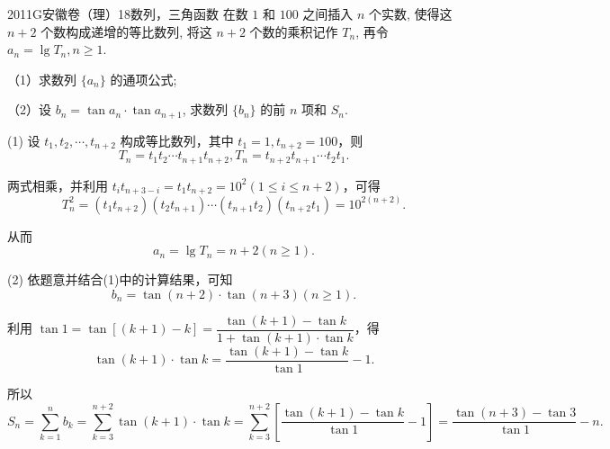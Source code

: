 
\begin{problem}{2011}{G}{安徽卷（理）}{18}{数列，三角函数}
在数 $1$ 和 $100$ 之间插入 $n$ 个实数, 使得这 $n+2$ 个数构成递增的等比数列, 将这 $n+2$ 个数的乘积记作 $T_n$, 再令 $a_n = \lg T_n, n \ge 1$.

（1）求数列 $\{a_n\}$ 的通项公式;

（2）设 $b_n = \tan a_n \cdot \tan a_{n+1}$, 求数列 $\{b_n\}$ 的前 $n$ 项和 $S_n$.
\end{problem}

\begin{solutions}
(1) 设 $t_1, t_2, \cdots, t_{n+2}$ 构成等比数列，其中 $t_1=1, t_{n+2}=100$，则
$$
T_n=t_1 t_2 \cdots t_{n+1} t_{n+2}, T_n=t_{n+2} t_{n+1} \cdots t_2 t_1.
$$

两式相乘，并利用 $t_i t_{n+3-i} = t_1 t_{n+2} = 10^2 (1 \leqslant i \leqslant n+2)$，可得
$$
T_n^2=(t_1 t_{n+2})(t_2 t_{n+1}) \cdots (t_{n+1} t_2)(t_{n+2} t_1) = 10^{2(n+2)}.
$$

从而
$$
a_n=\lg T_n=n+2 (n \geqslant 1).
$$

(2) 依题意并结合(1)中的计算结果，可知
$$
b_n=\tan(n+2) \cdot \tan(n+3) (n \geqslant 1).
$$

利用 $\tan 1 = \tan[(k+1)-k] = \dfrac{\tan(k+1)-\tan k}{1+\tan(k+1) \cdot \tan k}$，得
$$
\tan(k+1) \cdot \tan k = \frac{\tan(k+1)-\tan k}{\tan 1} - 1.
$$

所以
$$
S_n = \sum_{k=1}^n b_k = \sum_{k=3}^{n+2} \tan(k+1) \cdot \tan k = \sum_{k=3}^{n+2} \left[\frac{\tan(k+1)-\tan k}{\tan 1} - 1\right] = \frac{\tan(n+3)-\tan 3}{\tan 1} - n.
$$
\end{solutions}